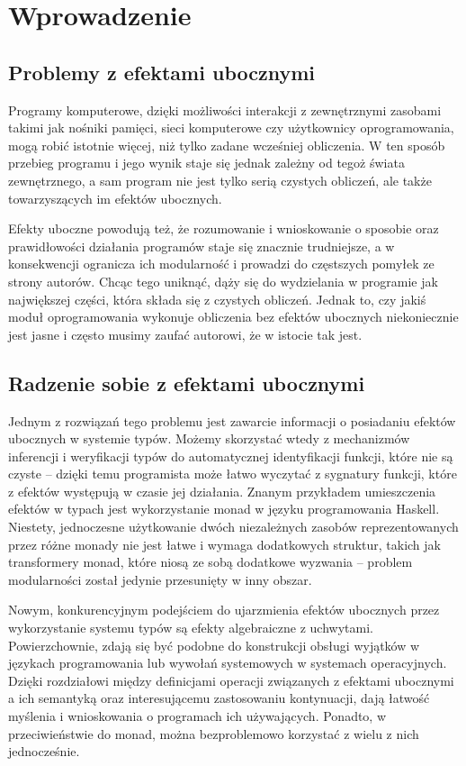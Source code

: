 \chapter{Wprowadzenie}

\section{Problemy z efektami ubocznymi}

Programy komputerowe, dzięki możliwości interakcji z zewnętrznymi zasobami takimi jak nośniki pamięci, sieci komputerowe czy użytkownicy oprogramowania, mogą robić istotnie więcej, niż tylko zadane wcześniej obliczenia. W ten sposób przebieg programu i jego wynik staje się jednak zależny od tegoż świata zewnętrznego, a sam program nie jest tylko serią czystych obliczeń, ale także towarzyszących im efektów ubocznych.

Efekty uboczne powodują też, że rozumowanie i wnioskowanie o sposobie oraz prawidłowości działania programów staje się znacznie trudniejsze, a w konsekwencji ogranicza ich modularność i prowadzi do częstszych pomyłek ze strony autorów. Chcąc tego uniknąć, dąży się do wydzielania w programie jak największej części, która składa się z czystych obliczeń. Jednak to, czy jakiś moduł oprogramowania wykonuje obliczenia bez efektów ubocznych niekoniecznie jest jasne i często musimy zaufać autorowi, że w istocie tak jest.

\section{Radzenie sobie z efektami ubocznymi}

Jednym z rozwiązań tego problemu jest zawarcie informacji o posiadaniu efektów ubocznych w systemie typów. Możemy skorzystać wtedy z mechanizmów inferencji i weryfikacji typów do automatycznej identyfikacji funkcji, które nie są czyste -- dzięki temu programista może łatwo wyczytać z sygnatury funkcji, które z efektów występują w czasie jej działania. Znanym przykładem umieszczenia efektów w typach jest wykorzystanie monad w języku programowania Haskell. Niestety, jednoczesne użytkowanie dwóch niezależnych zasobów reprezentowanych przez różne monady nie jest łatwe i wymaga dodatkowych struktur, takich jak transformery monad, które niosą ze sobą dodatkowe wyzwania -- problem modularności został jedynie przesunięty w inny obszar.

Nowym, konkurencyjnym podejściem do ujarzmienia efektów ubocznych przez wykorzystanie systemu typów są efekty algebraiczne z uchwytami. Powierzchownie, zdają się być podobne do konstrukcji obsługi wyjątków w językach programowania lub wywołań systemowych w systemach operacyjnych. Dzięki rozdziałowi między definicjami operacji związanych z efektami ubocznymi a ich semantyką oraz interesującemu zastosowaniu kontynuacji, dają łatwość myślenia i wnioskowania o programach ich używających. Ponadto, w przeciwieństwie do monad, można bezproblemowo korzystać z wielu z nich jednocześnie.

